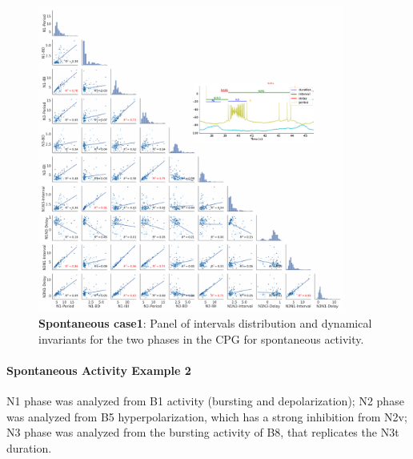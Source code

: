 \begin{figure}[htbp]
	\centering
	\includegraphics[width=0.9\textwidth]{./invariants/data/SUSSEX/prep1/images/2phases/panel_with_pairplot.pdf}
	\caption{\textbf{Spontaneous case1}: Panel of intervals distribution and dynamical invariants for the two phases in the CPG for spontaneous activity.}
	\label{fig:prep1 2 phases invariants pairplot}
\end{figure}

\paragraph{Spontaneous Activity Example 2}
N1 phase was analyzed from B1 activity (bursting and depolarization); N2 phase was analyzed from B5 hyperpolarization, which has a strong inhibition from N2v; N3 phase was analyzed from the bursting activity of B8, that replicates the N3t duration. 

